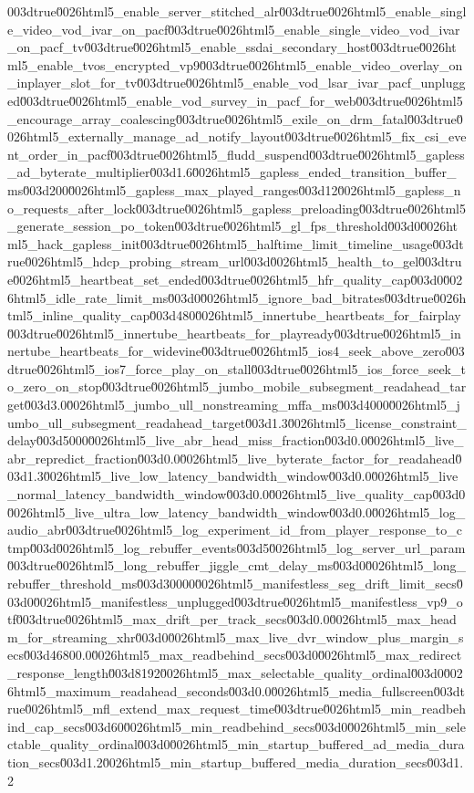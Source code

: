{003dtrue\u0026html5_enable_server_stitched_alr\u003dtrue\u0026html5_enable_single_video_vod_ivar_on_pacf\u003dtrue\u0026html5_enable_single_video_vod_ivar_on_pacf_tv\u003dtrue\u0026html5_enable_ssdai_secondary_host\u003dtrue\u0026html5_enable_tvos_encrypted_vp9\u003dtrue\u0026html5_enable_video_overlay_on_inplayer_slot_for_tv\u003dtrue\u0026html5_enable_vod_lsar_ivar_pacf_unplugged\u003dtrue\u0026html5_enable_vod_survey_in_pacf_for_web\u003dtrue\u0026html5_encourage_array_coalescing\u003dtrue\u0026html5_exile_on_drm_fatal\u003dtrue\u0026html5_externally_manage_ad_notify_layout\u003dtrue\u0026html5_fix_csi_event_order_in_pacf\u003dtrue\u0026html5_fludd_suspend\u003dtrue\u0026html5_gapless_ad_byterate_multiplier\u003d1.6\u0026html5_gapless_ended_transition_buffer_ms\u003d200\u0026html5_gapless_max_played_ranges\u003d12\u0026html5_gapless_no_requests_after_lock\u003dtrue\u0026html5_gapless_preloading\u003dtrue\u0026html5_generate_session_po_token\u003dtrue\u0026html5_gl_fps_threshold\u003d0\u0026html5_hack_gapless_init\u003dtrue\u0026html5_halftime_limit_timeline_usage\u003dtrue\u0026html5_hdcp_probing_stream_url\u003d\u0026html5_health_to_gel\u003dtrue\u0026html5_heartbeat_set_ended\u003dtrue\u0026html5_hfr_quality_cap\u003d0\u0026html5_idle_rate_limit_ms\u003d0\u0026html5_ignore_bad_bitrates\u003dtrue\u0026html5_inline_quality_cap\u003d480\u0026html5_innertube_heartbeats_for_fairplay\u003dtrue\u0026html5_innertube_heartbeats_for_playready\u003dtrue\u0026html5_innertube_heartbeats_for_widevine\u003dtrue\u0026html5_ios4_seek_above_zero\u003dtrue\u0026html5_ios7_force_play_on_stall\u003dtrue\u0026html5_ios_force_seek_to_zero_on_stop\u003dtrue\u0026html5_jumbo_mobile_subsegment_readahead_target\u003d3.0\u0026html5_jumbo_ull_nonstreaming_mffa_ms\u003d4000\u0026html5_jumbo_ull_subsegment_readahead_target\u003d1.3\u0026html5_license_constraint_delay\u003d5000\u0026html5_live_abr_head_miss_fraction\u003d0.0\u0026html5_live_abr_repredict_fraction\u003d0.0\u0026html5_live_byterate_factor_for_readahead\u003d1.3\u0026html5_live_low_latency_bandwidth_window\u003d0.0\u0026html5_live_normal_latency_bandwidth_window\u003d0.0\u0026html5_live_quality_cap\u003d0\u0026html5_live_ultra_low_latency_bandwidth_window\u003d0.0\u0026html5_log_audio_abr\u003dtrue\u0026html5_log_experiment_id_from_player_response_to_ctmp\u003d\u0026html5_log_rebuffer_events\u003d5\u0026html5_log_server_url_param\u003dtrue\u0026html5_long_rebuffer_jiggle_cmt_delay_ms\u003d0\u0026html5_long_rebuffer_threshold_ms\u003d30000\u0026html5_manifestless_seg_drift_limit_secs\u003d0\u0026html5_manifestless_unplugged\u003dtrue\u0026html5_manifestless_vp9_otf\u003dtrue\u0026html5_max_drift_per_track_secs\u003d0.0\u0026html5_max_headm_for_streaming_xhr\u003d0\u0026html5_max_live_dvr_window_plus_margin_secs\u003d46800.0\u0026html5_max_readbehind_secs\u003d0\u0026html5_max_redirect_response_length\u003d8192\u0026html5_max_selectable_quality_ordinal\u003d0\u0026html5_maximum_readahead_seconds\u003d0.0\u0026html5_media_fullscreen\u003dtrue\u0026html5_mfl_extend_max_request_time\u003dtrue\u0026html5_min_readbehind_cap_secs\u003d60\u0026html5_min_readbehind_secs\u003d0\u0026html5_min_selectable_quality_ordinal\u003d0\u0026html5_min_startup_buffered_ad_media_duration_secs\u003d1.2\u0026html5_min_startup_buffered_media_duration_secs\u003d1.2}
